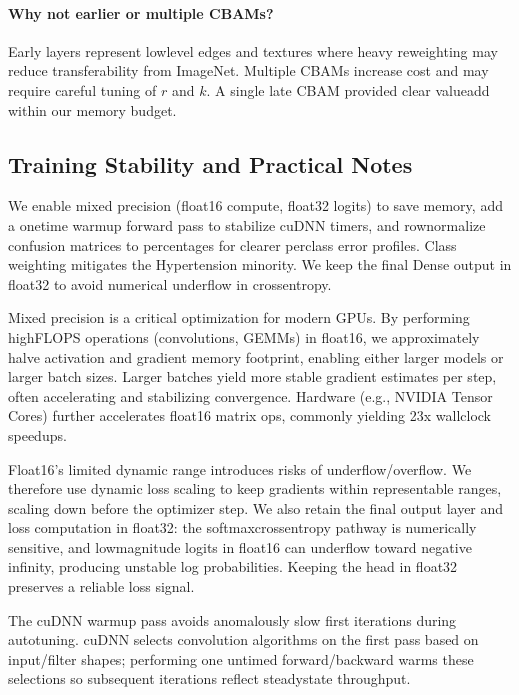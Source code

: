 \paragraph{Why not earlier or multiple CBAMs?}
Early layers represent low\textendash level edges and textures where heavy reweighting may reduce transferability from ImageNet. Multiple CBAMs increase cost and may require careful tuning of $r$ and $k$. A single late CBAM provided clear value\textendash add within our memory budget.

\subsection{Training Stability and Practical Notes}
We enable mixed precision (float16 compute, float32 logits) to save memory, add a one\textendash time warm\textendash up forward pass to stabilize cuDNN timers, and row\textendash normalize confusion matrices to percentages for clearer per\textendash class error profiles. Class weighting mitigates the Hypertension minority. We keep the final Dense output in float32 to avoid numerical underflow in cross\textendash entropy.

Mixed precision is a critical optimization for modern GPUs. By performing high\textendash FLOPS operations (convolutions, GEMMs) in float16, we approximately halve activation and gradient memory footprint, enabling either larger models or larger batch sizes. Larger batches yield more stable gradient estimates per step, often accelerating and stabilizing convergence. Hardware (e.g., NVIDIA Tensor Cores) further accelerates float16 matrix ops, commonly yielding 2\textendash 3x wall\textendash clock speedups.

Float16's limited dynamic range introduces risks of underflow/overflow. We therefore use dynamic loss scaling to keep gradients within representable ranges, scaling down before the optimizer step. We also retain the final output layer and loss computation in float32: the softmax\textendash cross\textendash entropy pathway is numerically sensitive, and low\textendash magnitude logits in float16 can underflow toward negative infinity, producing unstable log probabilities. Keeping the head in float32 preserves a reliable loss signal.

The cuDNN warm\textendash up pass avoids anomalously slow first iterations during auto\textendash tuning. cuDNN selects convolution algorithms on the first pass based on input/filter shapes; performing one untimed forward/backward warms these selections so subsequent iterations reflect steady\textendash state throughput.

